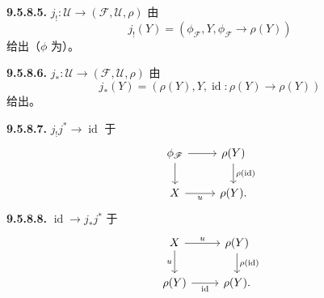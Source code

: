 \textbf{9.5.8.5.}  $j_!:\mathscr U\to(\mathscr F,\mathscr U,\rho)$ 由
\[
j_!(Y)=(\phi_{\mathscr F},Y,\phi_{\mathscr F}\to\rho(Y))
\]
给出（$\phi$ 为）。

\textbf{9.5.8.6.}  $j_*:\mathscr U\to(\mathscr F,\mathscr U,\rho)$ 由
\[
j_*(Y)=(\rho(Y),Y,\operatorname{id}:\rho(Y)\to\rho(Y))
\]
给出。

\textbf{9.5.8.7.}  $j_!j^*\to\operatorname{id}$ 于
\[
\begin{tikzcd}
\phi_{\mathscr F}\arrow[r]\arrow[d]&\rho(Y)\arrow[d,"\rho(\operatorname{id})"]\\
X\arrow[r,"u"']&\rho(Y).
\end{tikzcd}
\]
\textbf{9.5.8.8.}  $\operatorname{id}\to j_*j^*$ 于
\[
\begin{tikzcd}
X\arrow[r,"u"]\arrow[d,"u"']&\rho(Y)\arrow[d,"\rho(\operatorname{id})"]\\
\rho(Y)\arrow[r,"\operatorname{id}"']&\rho(Y).
\end{tikzcd}
\]
